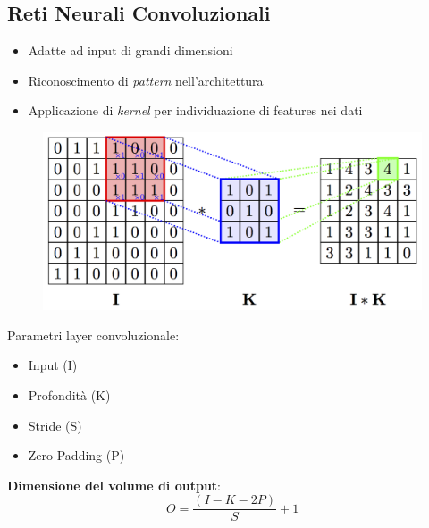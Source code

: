 \documentclass[xcolor=x11names,compress, 
]{beamer}
\theoremstyle{definition} \newtheorem{esempio}{Esempio}
\theoremstyle{definition}
\begin{document}
	\subsection{Reti Neurali Convoluzionali}
		\begin{frame}{\subsecname}
			\begin{itemize}
				\item Adatte ad input di grandi dimensioni\pause
				\item Riconoscimento di \textit{pattern} nell'architettura\pause
				\item Applicazione di \textit{kernel} per individuazione di features nei dati
			\end{itemize}
			\begin{figure}
				\includegraphics[scale=0.9]{immagini/convolution}
			\end{figure}
		\end{frame}
		\begin{frame}{\subsecname}
			Parametri layer convoluzionale:
			\begin{itemize}
				\item Input (I)
				\item Profondità (K)
				\item Stride (S)
				\item Zero-Padding (P)
			\end{itemize}\pause
			\begin{center}
				\textbf{Dimensione del volume di output}:
				\begin{equation}
					O={\frac{(I - K - 2P)}{S} +1}
				\end{equation}
			\end{center}
		\end{frame}
\end{document}
